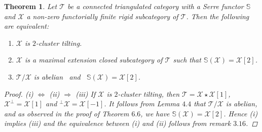 \documentclass[oneside, a4paper,reqno]{amsart}
\numberwithin{equation}{section}
\newtheorem{thm}{Theorem}[section]
\theoremstyle{definition}
\begin{document}
\begin{thm} Let ${\mathcal T}$ be a connected triangulated category with a Serre functor $\mathbb S$ and  ${\mathcal X}$ a non-zero  functorially finite rigid subcategory of ${\mathcal T}$.  Then the following are equivalent:
\begin{enumerate} 
\item ${\mathcal X}$ is $2$-cluster tilting.
\item ${\mathcal X}$ is a maximal extension closed subcategory of ${\mathcal T}$ such that $\mathbb S({\mathcal X}) = {\mathcal X}[2]$. 
\item ${\mathcal T}/{\mathcal X}$ is abelian \, and \, $\mathbb S({\mathcal X}) = {\mathcal X}[2]$. 
\end{enumerate}
\begin{proof} (i) $\Longleftrightarrow$ (ii) $\Longrightarrow$ (iii) If ${\mathcal X}$ is $2$-cluster tilting, then ${\mathcal T} = {\mathcal X} \star {\mathcal X}[1]$, ${\mathcal X}^{\bot} = {\mathcal X}[1]$ and ${^{\bot}}{\mathcal X} = {\mathcal X}[-1]$. It follows from Lemma $4.4$ that ${\mathcal T}/{\mathcal X}$ is abelian, and as observed in the proof of Theorem $6.6$, we have $\mathbb S({\mathcal X}) = {\mathcal X}[2]$. Hence (i) implies (iii) and  the  equivalence between (i) and (ii) follows from remark $3.16$. 


\end{proof}
\end{thm}
\end{document}
